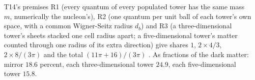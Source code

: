 T14's premises R1 (every quantum of every populated tower has the same mass $m$, numerically the nucleon's), R2 (one quantum per unit ball of each tower's own space, with a common Wigner-Seitz radius $d_{b}$) and R3 (a three-dimensional tower's sheets stacked one cell radius apart; a five-dimensional tower's matter counted through one radius of its extra direction) give shares $1$, $2 \times 4/3$, $2 \times 8/(3\pi)$ and the total $(11\pi + 16)/(3\pi)$ \cite[Prem.~7.2 to 7.4, Prop.~7.6]{ButlerT14}. As fractions of the dark matter: mirror $18.6$ percent, each three-dimensional tower $24.9$, each five-dimensional tower $15.8$.
